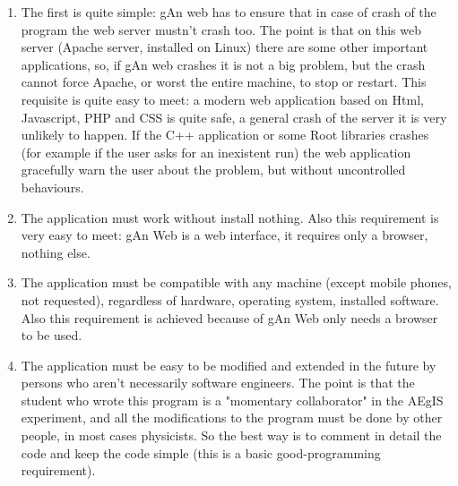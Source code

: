 \begin{enumerate}

\item The first is quite simple: gAn web has to ensure that in case of crash of the program the web server mustn't crash too. The point is that on this web server (Apache server, installed on Linux) there are some other important applications, so, if gAn web crashes it is not a big problem, but the crash cannot force Apache, or worst the entire machine, to stop or restart. 
This requisite is quite easy to meet: a modern web application based on Html, Javascript, PHP and CSS is quite safe, a general crash of the server it is very unlikely to happen. If the C++ application or some Root libraries crashes (for example if the user asks for an inexistent run) the web application gracefully warn the user about the problem, but without uncontrolled behaviours.  

\item The application must work without install nothing. Also this requirement is very easy to meet: gAn Web is a web interface, it requires only a browser, nothing else.

\item The application must be compatible with any machine (except mobile phones, not requested), regardless of hardware, operating system, installed software. Also this requirement is achieved because of gAn Web only needs a browser to be used. 

\item The application must be easy to be modified and extended in the future by persons who aren't necessarily software engineers. The point is that the student who wrote this program is a "momentary collaborator" in the AEgIS experiment, and all the modifications to the program must be done by other people, in most cases physicists. So the best way is to comment in detail the code and keep the code simple (this is a basic good-programming requirement).   


\end{enumerate}

